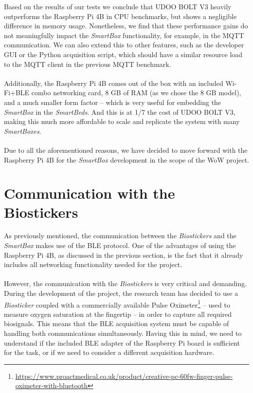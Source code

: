 Based on the results of our tests we conclude that UDOO BOLT V3 heavily outperforms the Raspberry Pi 4B in CPU benchmarks, but shows a negligible difference in memory usage. Nonetheless, we find that these performance gains do not meaningfully impact the \textit{SmartBox} functionality, for example, in the \acs{MQTT} communication. We can also extend this to other features, such as the developer \acs{GUI} or the Python acquisition script, which should have a similar resource load to the \acs{MQTT} client in the previous \acs{MQTT} benchmark.

\paragraph{} Additionally, the Raspberry Pi 4B comes out of the box with an included Wi-Fi+\acs{BLE} combo networking card, 8 GB of RAM (as we chose the 8 GB model), and a much smaller form factor -- which is very useful for embedding the \textit{SmartBox} in the \textit{SmartBeds}. And this is at 1/7 the cost of UDOO BOLT V3, making this much more affordable to scale and replicate the system with many \textit{SmartBoxes}.

\paragraph{} Due to all the aforementioned reasons, we have decided to move forward with the Raspberry Pi 4B for the \textit{SmartBox} development in the scope of the \acs{WoW} project.

\section{Communication with the Biostickers}

As previously mentioned, the communication between the \textit{Biostickers} and the \textit{SmartBox} makes use of the \acs{BLE} protocol. One of the advantages of using the Raspberry Pi 4B, as discussed in the previous section, is the fact that it already includes all networking functionality needed for the project. 


\paragraph{} However, the communication with the \textit{Biostickers} is very critical and demanding. During the development of the project, the research team has decided to use a \textit{Biosticker} coupled with a commercially available Pulse Oximeter\footnote{\url{https://www.proactmedical.co.uk/product/creative-pc-60fw-finger-pulse-oximeter-with-bluetooth}} -- used to measure oxygen saturation at the fingertip --  in order to capture all required biosignals. This means that the \acs{BLE} acquisition system must be capable of handling both communications simultaneously. Having this in mind, we need to understand if the included \acs{BLE} adapter of the Raspberry Pi board is sufficient for the task, or if we need to consider a different acquisition hardware.

